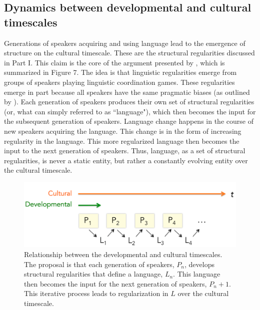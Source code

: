 \documentclass[man, noapacite, 12pt]{apa2}
\begin{document}
\subsection{Dynamics between developmental and cultural timescales}

Generations of speakers acquiring and using language lead to the emergence of structure on the cultural timescale. These are the structural regularities discussed in Part I. This claim is the core of the argument presented by , which is summarized in Figure 7. The idea is that linguistic regularities emerge from groups of speakers playing linguistic coordination games. These regularities emerge in part because all speakers have the same pragmatic biases (as outlined by ). Each generation of speakers produces their own set of structural regularities (or, what can simply referred to as ``language"), which then becomes the input for the subsequent generation of speakers. Language change happens in the course of new speakers acquiring the language. This change is in the form of increasing regularity in the language. This more regularized language then becomes the input to the next generation of speakers. Thus, language, as a set of structural regularities,  is never a static entity, but rather a constantly evolving entity over the cultural timescale. 

\begin{figure}
\begin{center} 
\includegraphics[width=6in]{figs/timescales2}
\caption{Relationship between the developmental and cultural timescales. The proposal is that each generation of speakers, $P_n$, develops structural regularities that define a language, $L_n$. This language then becomes the input for the next generation of speakers, $P_n+1$. This iterative process leads to regularization in $L$ over the cultural timescale. }
\end{center} 
\end{figure}
\end{document}
